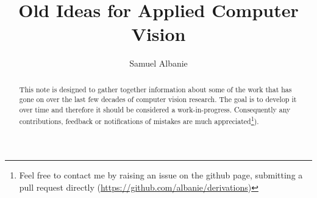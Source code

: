 \documentclass[11pt,openany]{memoir}
\title{Old Ideas for Applied Computer Vision}
\author{
Samuel Albanie
}
\date{}
\begin{document}


\frontmatter
\maketitle{}

\begin{abstract}
This note is designed to gather together information about some of the work that has gone on over the last few decades of computer vision research.
The goal is to develop it over time and therefore it should be considered a work-in-progress.  Consequently any contributions, feedback or notifications of mistakes are much appreciated\footnote{Feel free to contact me by raising an issue on the github page, submitting a pull request directly (\mbox{\url{https://github.com/albanie/derivations})}}).
\end{abstract}
\clearpage

\tableofcontents*
\clearpage

\mainmatter





\end{document}
